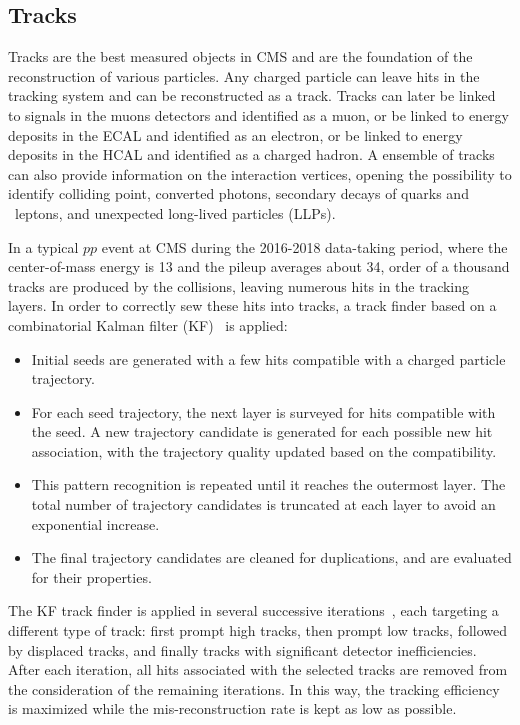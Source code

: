 \subsection{Tracks}\label{sec:reco_track}

Tracks are the best measured objects in CMS and are the foundation of the reconstruction of various particles.
Any charged particle can leave hits in the tracking system and can be reconstructed as a track.
Tracks can later be linked to signals in the muons detectors and identified as a muon, 
or be linked to energy deposits in the ECAL and identified as an electron,
or be linked to energy deposits in the HCAL and identified as a charged hadron.
A ensemble of tracks can also provide information on the interaction vertices, 
opening the possibility to identify colliding point, converted photons, 
secondary decays of \Pqb quarks and \tau ~leptons, and unexpected long-lived particles (LLPs).

In a typical $pp$ event at CMS during the 2016-2018 data-taking period, 
where the center-of-mass energy is 13 \TeV and the pileup averages about 34,
order of a thousand tracks are produced by the collisions, leaving numerous hits in the tracking layers.
In order to correctly sew these hits into tracks, a track finder based on a combinatorial Kalman filter (KF)~\cite{Adam:934067} is applied:
\begin{itemize}
  \item Initial seeds are generated with a few hits compatible with a charged particle trajectory.
  \item For each seed trajectory, the next layer is surveyed for hits compatible with the seed.
        A new trajectory candidate is generated for each possible new hit association, 
        with the trajectory quality updated based on the compatibility.
  \item This pattern recognition is repeated until it reaches the outermost layer.
        The total number of trajectory candidates is truncated at each layer to avoid an exponential increase. 
  \item The final trajectory candidates are cleaned for duplications, 
        and are evaluated for their properties.
\end{itemize}

The KF track finder is applied in several successive iterations~\cite{Collaboration_2014}, 
each targeting a different type of track: first prompt high \pt tracks, then prompt low \pt tracks,
followed by displaced tracks, and finally tracks with significant detector inefficiencies.
After each iteration, all hits associated with the selected tracks are removed from the consideration of the remaining iterations.
In this way, the tracking efficiency is maximized while the mis-reconstruction rate is kept as low as possible.

